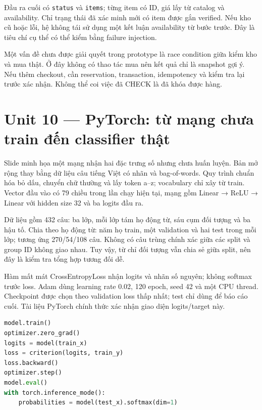 Đầu ra cuối có \passthrough{\lstinline!status!} và
\passthrough{\lstinline!items!}; từng item có ID, giá lấy từ catalog và
availability. Chỉ trạng thái đã xác minh mới có item được gắn verified.
Nếu kho cũ hoặc lỗi, hệ không tái sử dụng một kết luận availability từ
bước trước. Đây là tiêu chí cụ thể có thể kiểm bằng failure injection.

Một vấn đề chưa được giải quyết trong prototype là race condition giữa
kiểm kho và mua thật. Ở đây không có thao tác mua nên kết quả chỉ là
snapshot gợi ý. Nếu thêm checkout, cần reservation, transaction,
idempotency và kiểm tra lại trước xác nhận. Không thể coi việc đã CHECK
là đã khóa được hàng.

\section{Unit 10 --- PyTorch: từ mạng chưa train đến classifier
thật}\label{unit-10-pytorch-tux1eeb-mux1ea1ng-chux1b0a-train-ux111ux1ebfn-classifier-thux1eadt}

Slide minh họa một mạng nhận hai đặc trưng số nhưng chưa huấn luyện. Bản
mở rộng thay bằng dữ liệu câu tiếng Việt có nhãn và bag-of-words. Quy
trình chuẩn hóa bỏ dấu, chuyển chữ thường và lấy token a--z; vocabulary
chỉ xây từ train. Vector đầu vào có 79 chiều trong lần chạy hiện tại,
mạng gồm Linear → ReLU → Linear với hidden size 32 và ba logits đầu ra.

Dữ liệu gồm 432 câu: ba lớp, mỗi lớp tám họ động từ, sáu cụm đối tượng
và ba hậu tố. Chia theo họ động từ: năm họ train, một validation và hai
test trong mỗi lớp; tương ứng 270/54/108 câu. Không có câu trùng chính
xác giữa các split và group ID không giao nhau. Tuy vậy, từ chỉ đối
tượng vẫn chia sẻ giữa split, nên đây là kiểm tra tổng hợp tương đối dễ.

Hàm mất mát CrossEntropyLoss nhận logits và nhãn số nguyên; không
softmax trước loss. Adam dùng learning rate 0.02, 120 epoch, seed 42 và
một CPU thread. Checkpoint được chọn theo validation loss thấp nhất;
test chỉ dùng để báo cáo cuối. Tài liệu PyTorch chính thức xác nhận giao
diện logits/target này. \cite{torchce}

\begin{lstlisting}[language=Python]
model.train()
optimizer.zero_grad()
logits = model(train_x)
loss = criterion(logits, train_y)
loss.backward()
optimizer.step()
model.eval()
with torch.inference_mode():
    probabilities = model(test_x).softmax(dim=1)
\end{lstlisting}

